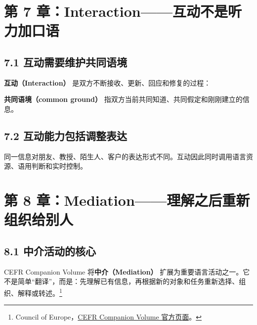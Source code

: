 \documentclass[11pt,a4paper]{ctexart}
\newcommand{\term}[2]{\textbf{#1（#2）}}
\begin{document}
\section{第 7 章：Interaction——互动不是听力加口语}

\subsection{7.1 互动需要维护共同语境}
\term{互动}{Interaction} 是双方不断接收、更新、回应和修复的过程：
\begin{center}
\end{center}
\term{共同语境}{common ground} 指双方当前共同知道、共同假定和刚刚建立的信息。

\subsection{7.2 互动能力包括调整表达}
同一信息对朋友、教授、陌生人、客户的表达形式不同。互动因此同时调用语言资源、语用判断和实时控制。

\section{第 8 章：Mediation——理解之后重新组织给别人}

\subsection{8.1 中介活动的核心}
CEFR Companion Volume 将\term{中介}{Mediation} 扩展为重要语言活动之一。它不是简单“翻译”，而是：先理解已有信息，再根据新的对象和任务重新选择、组织、解释或转述。\footnote{Council of Europe，\href{https://www.coe.int/en/web/common-european-framework-reference-languages/home}{CEFR Companion Volume 官方页面}。}
\end{document}
